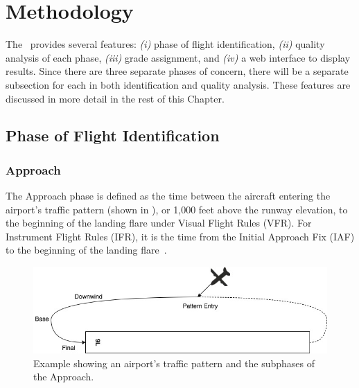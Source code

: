 \chapter{Methodology} \label{ch:methodology}

	The \toolname\ provides several features: \textit{(i)} phase of flight identification, \textit{(ii)} quality analysis of each phase, \textit{(iii)} grade assignment, and \textit{(iv)} a web interface to display results.  Since there are three separate phases of concern, there will be a separate subsection for each in both identification and quality analysis.  These features are discussed in more detail in the rest of this Chapter.

\section{Phase of Flight Identification} \label{sec:phase_identification}


	\subsection{Approach}
    
    	The Approach phase is defined as the time between the aircraft entering the airport's traffic pattern (shown in ), or 1,000 feet above the runway elevation, to the beginning of the landing flare under Visual Flight Rules (VFR).  For Instrument Flight Rules (IFR), it is the time from the Initial Approach Fix (IAF) to the beginning of the landing flare~\cite{cictt2013phase}.
        
        \begin{figure}
        	\centering
            \includegraphics[width=\linewidth]{img/airport_traffic_pattern.jpg}
            \caption{Example showing an airport's traffic pattern and the subphases of the Approach.}
            \label{fig:traffic_pattern}
        \end{figure}
        

